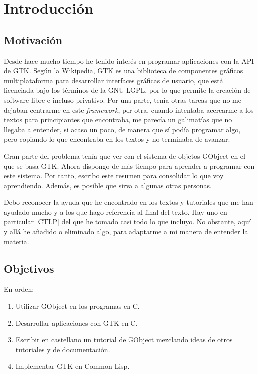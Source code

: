 %

\section{Introducción}

\subsection{Motivación} \label{subsec:motivacion}
Desde hace mucho tiempo he tenido interés en programar aplicaciones con la API de GTK.
Según la Wikipedia, GTK es una biblioteca de componentes gráficos multiplataforma para desarrollar
interfaces gráficas de usuario, que está licenciada bajo los términos de la GNU LGPL, por lo que
permite la creación de software libre e incluso privativo.
Por una parte, tenía otras tareas que no me dejaban centrarme en este \textit{framework},
por otra, cuando intentaba acercarme a los textos para principiantes que encontraba, me parecía un
galimatías que no llegaba a entender, si acaso un poco, de manera que sí podía programar algo, pero
copiando lo que encontraba en los textos y no terminaba de avanzar.

Gran parte del problema tenía que ver con el sistema de objetos \textsf{GObject} en el que se basa GTK.
Ahora dispongo de más tiempo para aprender a programar con este sistema. Por tanto, escribo este
resumen para consolidar  lo que voy aprendiendo. Además, es posible que sirva a algunas otras personas.

Debo reconocer la ayuda que he encontrado en los textos y tutoriales que me han ayudado mucho y
a los que hago referencia al final del texto. Hay uno en particular [CTLP] del que he tomado casi todo lo
que incluyo. No obstante, aquí y allá he añadido o eliminado algo, para adaptarme a mi manera de entender
la materia.
\subsection{Objetivos} \label{subsec:objetivos}
En orden:
\begin{enumerate}
  \tightlist
\item Utilizar \textsf{GObject} en los programas en C.
\item Desarrollar aplicaciones con GTK en C.
\item Escribir en castellano un tutorial de GObject mezclando ideas de otros tutoriales y de documentación.
\item Implementar GTK en Common Lisp.
\end{enumerate}

